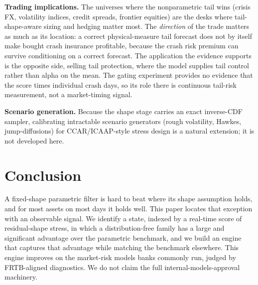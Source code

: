 \documentclass[11pt]{article}
\theoremstyle{remark}
\begin{document}
\textbf{Trading implications.} The universes where the nonparametric tail wins (crisis FX, volatility indices, credit spreads, frontier equities) are the desks where tail-shape-aware
sizing and hedging matter most. The \emph{direction} of the trade matters
as much as its location: a correct physical-measure tail forecast
does not by itself make bought crash insurance profitable, because the
crash risk premium can survive conditioning on a correct forecast.
The application the evidence supports is the opposite side, selling tail
protection, where the model supplies tail control rather than alpha on
the mean. The gating experiment provides no evidence that the score times
individual crash days, so its role there is continuous tail-risk
measurement, not a market-timing signal.

\textbf{Scenario generation.} Because the shape stage carries an exact
inverse-CDF sampler, calibrating intractable scenario generators
(rough volatility, Hawkes, jump-diffusions) for CCAR/ICAAP-style
stress design is a natural extension; it is not developed here.

\section{Conclusion}\label{sec:limitations}

A fixed-shape parametric filter is hard to beat where its shape
assumption holds, and for most assets on most days it holds well. This
paper locates that exception with an observable signal. We
identify a state, indexed by a real-time score of residual-shape stress,
in which a distribution-free family has a large and significant advantage
over the parametric benchmark, and we build an engine that captures that
advantage while matching the benchmark elsewhere. This engine improves on
the market-risk models banks commonly run, judged by FRTB-aligned
diagnostics. We do not claim the full internal-models-approval machinery.
\end{document}
